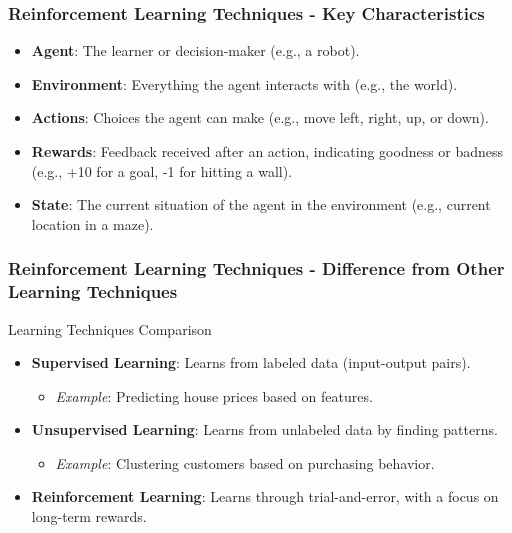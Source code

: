 \documentclass[aspectratio=169]{beamer}
\begin{document}
\begin{frame}[fragile]
  \frametitle{Reinforcement Learning Techniques - Key Characteristics}
  \begin{itemize}
    \item \textbf{Agent}: The learner or decision-maker (e.g., a robot).
    \item \textbf{Environment}: Everything the agent interacts with (e.g., the world).
    \item \textbf{Actions}: Choices the agent can make (e.g., move left, right, up, or down).
    \item \textbf{Rewards}: Feedback received after an action, indicating goodness or badness (e.g., +10 for a goal, -1 for hitting a wall).
    \item \textbf{State}: The current situation of the agent in the environment (e.g., current location in a maze).
  \end{itemize}
\end{frame}

\begin{frame}[fragile]
  \frametitle{Reinforcement Learning Techniques - Difference from Other Learning Techniques}
  \begin{block}{Learning Techniques Comparison}
    \begin{itemize}
      \item \textbf{Supervised Learning}: Learns from labeled data (input-output pairs).
        \begin{itemize}
          \item \textit{Example}: Predicting house prices based on features.
        \end{itemize}
      \item \textbf{Unsupervised Learning}: Learns from unlabeled data by finding patterns.
        \begin{itemize}
          \item \textit{Example}: Clustering customers based on purchasing behavior.
        \end{itemize}
      \item \textbf{Reinforcement Learning}: Learns through trial-and-error, with a focus on long-term rewards.
    \end{itemize}
  \end{block}
\end{frame}
\end{document}
